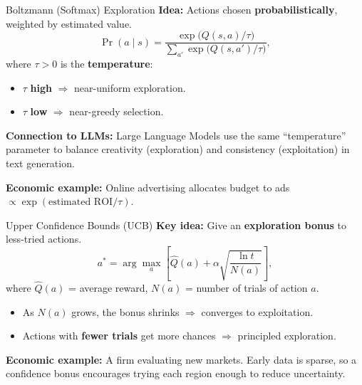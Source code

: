 \documentclass[10pt,english,aspectratio=169]{beamer}
\begin{document}
\begin{frame}{Boltzmann (Softmax) Exploration}
    \textbf{Idea:} Actions chosen \textbf{probabilistically}, weighted by estimated value.
    \[
       \Pr(a \mid s) = \frac{\exp\!\bigl(Q(s,a)/\tau\bigr)}{\sum_{a'} \exp\!\bigl(Q(s,a')/\tau\bigr)},
    \]
    where $\tau > 0$ is the \textbf{temperature}:
    \begin{itemize}
        \item $\tau$ \textbf{high} $\Rightarrow$ near-uniform exploration.
        \item $\tau$ \textbf{low} $\Rightarrow$ near-greedy selection.
    \end{itemize}

    \vspace{0.3cm}
    \textbf{Connection to LLMs:} Large Language Models use the same ``temperature'' parameter to balance creativity (exploration) and consistency (exploitation) in text generation.

    \vspace{0.3cm}
    \textbf{Economic example:} Online advertising allocates budget to ads $\propto \exp(\text{estimated ROI}/\tau)$.
\end{frame}

\begin{frame}{Upper Confidence Bounds (UCB)}
    \textbf{Key idea:} Give an \textbf{exploration bonus} to less-tried actions.
    \[
        a^* = \arg\max_a \left[\hat{Q}(a) + \alpha \sqrt{\frac{\ln t}{N(a)}}\right],
    \]
    where $\hat{Q}(a)$ = average reward, $N(a)$ = number of trials of action $a$.

    \begin{itemize}
        \item As $N(a)$ grows, the bonus shrinks $\Rightarrow$ converges to exploitation.
        \item Actions with \textbf{fewer trials} get more chances $\Rightarrow$ principled exploration.
    \end{itemize}

    \vspace{0.3cm}
    \textbf{Economic example:} A firm evaluating new markets. Early data is sparse, so a confidence bonus encourages trying each region enough to reduce uncertainty.
\end{frame}
\end{document}
